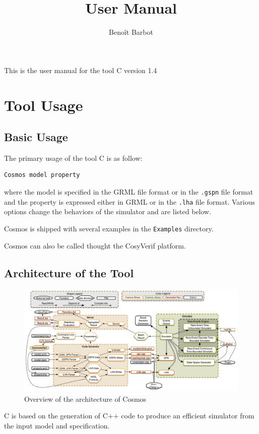 \documentclass{article}
\title{\cosmos{} User Manual}
\author{Beno\^it Barbot}
\newcommand{\cosmos}{\mbox{\textup{C}\scalebox{0.75}{{\textsc{OSMOS}}}}}
\begin{document}
\maketitle


This is the user manual for the tool \cosmos{} version 1.4

\section{Tool Usage}

\subsection{Basic Usage}
The primary usage of the tool \cosmos{} is as follow:
\begin{verbatim}
Cosmos model property
\end{verbatim}
where the model is specified in the GRML file format or in the
\verb|.gspn| file format and the property is expressed either in GRML
or in the \verb|.lha| file format. Various options change the behaviors 
of the simulator and are listed below.

Cosmos is shipped with several examples in the \verb|Examples| directory.

Cosmos can also be called thought the CosyVerif platform.




\subsection{Architecture of the Tool}
\begin{figure}[ht]
  \centering
  \includegraphics[width=\textwidth]{overviewcosmos}
  \caption{Overview of the architecture of Cosmos}
  \label{fig:overviewCosmos}
\end{figure}

\cosmos{} is based on the generation of C++ code to produce an efficient
simulator from the input model and specification. 
\end{document}
